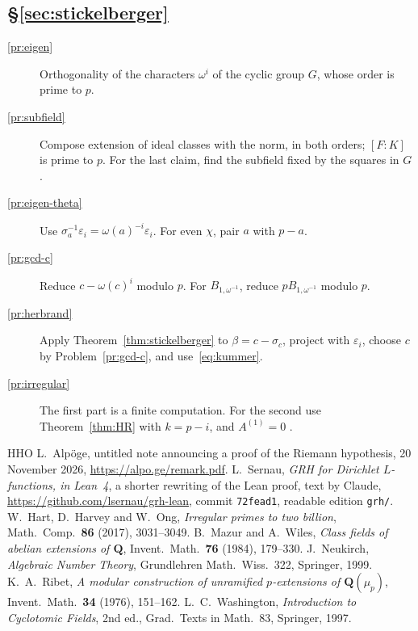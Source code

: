 \documentclass[reqno]{amsart}
\theoremstyle{definition}
\theoremstyle{plain}
\begin{document}
\subsection*{\S\ref{sec:stickelberger}}
\begin{description}
\item[\ref{pr:eigen}] Orthogonality of the characters \(\omega^i\) of the cyclic group \(G\), whose order is prime to \(p\).
\item[\ref{pr:subfield}] Compose extension of ideal classes with the norm, in both orders; \([F:K]\) is prime to \(p\).  For the last claim, find the subfield fixed by the squares in \(G\).
\item[\ref{pr:eigen-theta}] Use \(\sigma_a^{-1}\varepsilon_i = \omega(a)^{-i}\varepsilon_i\).  For even \(\chi\), pair \(a\) with \(p - a\).
\item[\ref{pr:gcd-c}] Reduce \(c - \omega(c)^i\) modulo \(p\).  For \(B_{1,\omega^{-1}}\), reduce \(p B_{1,\omega^{-1}}\) modulo \(p\).
\item[\ref{pr:herbrand}] Apply Theorem~\ref{thm:stickelberger} to \(\beta = c - \sigma_c\), project with \(\varepsilon_i\), choose \(c\) by Problem~\ref{pr:gcd-c}, and use~\eqref{eq:kummer}.
\item[\ref{pr:irregular}] The first part is a finite computation.  For the second use Theorem~\ref{thm:HR} with \(k = p - i\), and \(A^{(1)} = 0\) \cite[Prop.~6.16]{Wa}.
\end{description}

\begin{thebibliography}{HHO}
 L.~Alp\"oge, untitled note announcing a proof of the Riemann hypothesis, 20 November 2026, \url{https://alpo.ge/remark.pdf}.
 L.~Sernau, \emph{GRH for Dirichlet \(L\)-functions, in Lean~4}, a shorter rewriting of the Lean proof, text by Claude, \url{https://github.com/lsernau/grh-lean}, commit \texttt{72fead1}, readable edition \texttt{grh/}.
 W.~Hart, D.~Harvey and W.~Ong, \emph{Irregular primes to two billion}, Math.\ Comp.\ \textbf{86} (2017), 3031--3049.
 B.~Mazur and A.~Wiles, \emph{Class fields of abelian extensions of \(\mathbf{Q}\)}, Invent.\ Math.\ \textbf{76} (1984), 179--330.
 J.~Neukirch, \emph{Algebraic Number Theory}, Grundlehren Math.\ Wiss.\ 322, Springer, 1999.
 K.~A.~Ribet, \emph{A modular construction of unramified \(p\)-extensions of \(\mathbf{Q}(\mu_p)\)}, Invent.\ Math.\ \textbf{34} (1976), 151--162.
 L.~C.~Washington, \emph{Introduction to Cyclotomic Fields}, 2nd ed., Grad.\ Texts in Math.\ 83, Springer, 1997.
\end{thebibliography}
\end{document}
